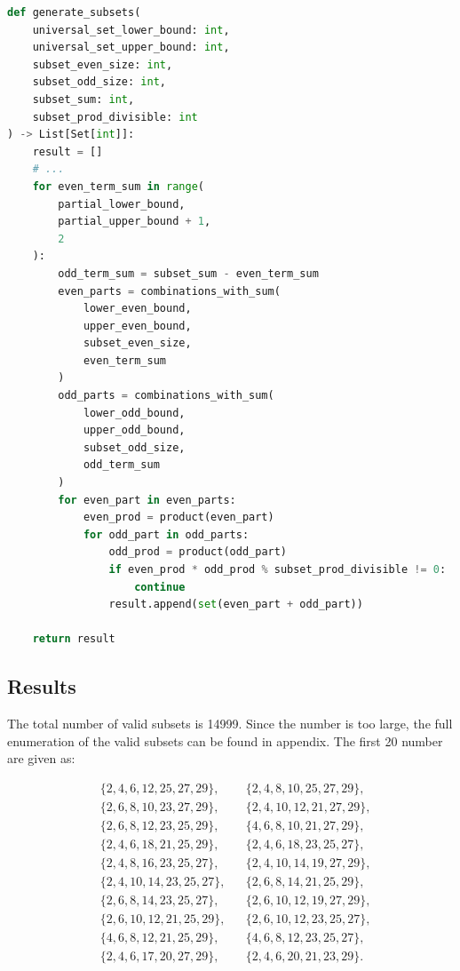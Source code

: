 \documentclass[11pt,a4paper]{article}
\begin{document}
\begin{lstlisting}[language=python]
def generate_subsets(
    universal_set_lower_bound: int,
    universal_set_upper_bound: int,
    subset_even_size: int,
    subset_odd_size: int,
    subset_sum: int,
    subset_prod_divisible: int
) -> List[Set[int]]:
    result = []
    # ...
    for even_term_sum in range(
        partial_lower_bound,
        partial_upper_bound + 1,
        2
    ):
        odd_term_sum = subset_sum - even_term_sum
        even_parts = combinations_with_sum(
            lower_even_bound,
            upper_even_bound,
            subset_even_size,
            even_term_sum
        )
        odd_parts = combinations_with_sum(
            lower_odd_bound,
            upper_odd_bound,
            subset_odd_size,
            odd_term_sum
        )
        for even_part in even_parts:
            even_prod = product(even_part)
            for odd_part in odd_parts:
                odd_prod = product(odd_part)
                if even_prod * odd_prod % subset_prod_divisible != 0:
                    continue
                result.append(set(even_part + odd_part))
    
    return result
\end{lstlisting}

\subsection*{Results}

The total number of valid subsets is 14999. Since the number is too large, the full enumeration of the valid subsets can be found in appendix. The first 20 number are given as:

\[
\begin{aligned}
&\{2,4,6,12,25,27,29\}, && \{2,4,8,10,25,27,29\},\\
&\{2,6,8,10,23,27,29\}, && \{2,4,10,12,21,27,29\},\\
&\{2,6,8,12,23,25,29\}, && \{4,6,8,10,21,27,29\},\\
&\{2,4,6,18,21,25,29\}, && \{2,4,6,18,23,25,27\},\\
&\{2,4,8,16,23,25,27\}, && \{2,4,10,14,19,27,29\},\\
&\{2,4,10,14,23,25,27\}, && \{2,6,8,14,21,25,29\},\\
&\{2,6,8,14,23,25,27\}, && \{2,6,10,12,19,27,29\},\\
&\{2,6,10,12,21,25,29\}, && \{2,6,10,12,23,25,27\},\\
&\{4,6,8,12,21,25,29\}, && \{4,6,8,12,23,25,27\},\\
&\{2,4,6,17,20,27,29\}, && \{2,4,6,20,21,23,29\}.
\end{aligned}
\]
\end{document}
